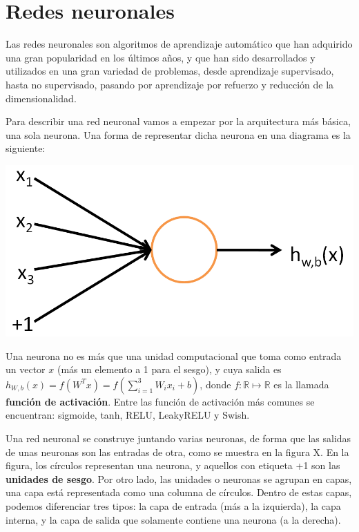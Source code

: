 \documentclass[
  12pt,
  a4paperpaper,
]{report}
\begin{document}
\hypertarget{redes-neuronales}{%
\section{Redes neuronales}\label{redes-neuronales}}

Las redes neuronales son algoritmos de aprendizaje automático que han
adquirido una gran popularidad en los últimos años, y que han sido
desarrollados y utilizados en una gran variedad de problemas, desde
aprendizaje supervisado, hasta no supervisado, pasando por aprendizaje
por refuerzo y reducción de la dimensionalidad.

Para describir una red neuronal vamos a empezar por la arquitectura más
básica, una sola neurona. Una forma de representar dicha neurona en una
diagrama es la siguiente:

\includegraphics{source/figures/single_neuron.png}

Una neurona no es más que una unidad computacional que toma como entrada
un vector \(x\) (más un elemento a 1 para el sesgo), y cuya salida es
\(h_{W, b}(x)=f\left(W^{T} x\right)=f\left(\sum_{i=1}^{3} W_{i} x_{i}+b\right)\),
donde \(f: \mathbb{R} \mapsto \mathbb{R}\) es la llamada \textbf{función
de activación}. Entre las función de activación más comunes se
encuentran: sigmoide, tanh, RELU, LeakyRELU y Swish.

Una red neuronal se construye juntando varias neuronas, de forma que las
salidas de unas neuronas son las entradas de otra, como se muestra en la
figura X. En la figura, los círculos representan una neurona, y aquellos
con etiqueta +1 son las \textbf{unidades de sesgo}. Por otro lado, las
unidades o neuronas se agrupan en capas, una capa está representada como
una columna de círculos. Dentro de estas capas, podemos diferenciar tres
tipos: la capa de entrada (más a la izquierda), la capa interna, y la
capa de salida que solamente contiene una neurona (a la derecha).
\end{document}
